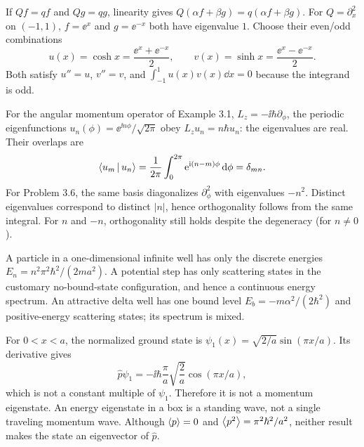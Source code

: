 If $Qf=qf$ and $Qg=qg$, linearity gives
$Q(\alpha f+\beta g)=q(\alpha f+\beta g)$.
For $Q=\partial_x^2$ on $(-1,1)$,
$f=\ee^x$ and $g=\ee^{-x}$ both have eigenvalue $1$.
Choose their even/odd combinations
\begin{equation}
u(x)=\cosh x=\frac{\ee^x+\ee^{-x}}2,\qquad
v(x)=\sinh x=\frac{\ee^x-\ee^{-x}}2.
\end{equation}
Both satisfy $u''=u$, $v''=v$, and
$\int_{-1}^1u(x)v(x)\dd x=0$
because the integrand is odd.

For the angular momentum operator of Example 3.1,
$L_z=-\ii\hbar\partial_\phi$,
the periodic eigenfunctions
$u_n(\phi)=\ee^{\ii n\phi}/\sqrt{2\pi}$
obey $L_zu_n=n\hbar u_n$: the eigenvalues are real.
Their overlaps are
\begin{equation}
\left\langle u_m\,\middle|\,u_n\right\rangle=
\frac1{2\pi}\int_0^{2\pi}
\mathrm{e}^{\mathrm{i}(n-m)\phi}\,\mathrm{d}\phi
=\delta_{mn}.
\end{equation}
For Problem 3.6, the same basis diagonalizes
$\partial_\phi^2$ with eigenvalues $-n^2$.
Distinct eigenvalues correspond to distinct
$|n|$, hence orthogonality follows from the
same integral. For $n$ and $-n$, orthogonality
still holds despite the degeneracy (for $n\ne0$).

A particle in a one-dimensional infinite well
has only the discrete energies
$E_n=n^2\pi^2\hbar^2/(2ma^2)$.
A potential step has only scattering states in
the customary no-bound-state configuration,
and hence a continuous energy spectrum.
An attractive delta well has one bound level
$E_b=-m\alpha^2/(2\hbar^2)$ and positive-energy
scattering states; its spectrum is mixed.

For $0<x<a$, the normalized ground state is
$\psi_1(x)=\sqrt{2/a}\sin(\pi x/a)$.
Its derivative gives
\begin{equation}
\hat p\psi_1=-\ii\hbar\frac{\pi}{a}
\sqrt{\frac2a}\cos(\pi x/a),
\end{equation}
which is not a constant multiple of $\psi_1$.
Therefore it is not a momentum eigenstate.
An energy eigenstate in a box is a standing wave,
not a single traveling momentum wave.
Although $\left\langle p\right\rangle=0$ and
$\left\langle p^2\right\rangle=\pi^2\hbar^2/a^2$, neither result
makes the state an eigenvector of $\hat p$.
